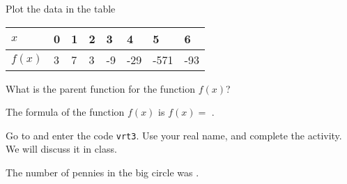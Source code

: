 \documentclass{ximera}
\begin{document}
\begin{question}
Plot the data in the table
\begin{center}
\begin{tabular}{llllllll}
    $x$  & 0 & 1 & 2 & 3  & 4   & 5    & 6   \\ \hline
    $f(x)$ & 3 & 7 & 3 & -9 & -29 & -571 & -93 \\
\end{tabular}
\end{center} 
What is the parent function for the function $f(x)$?
\begin{solution}
\begin{multiple-choice}
\end{multiple-choice}
The formula of the function $f(x)$ is $f(x)=$ .
\end{solution}

\end{question}




\begin{question}
Go to  and enter the code \verb|vrt3|. Use your real name, and complete the activity. We will discuss it in class.
\begin{solution}
The number of pennies in the big circle was .
\end{solution}
\end{question}
\end{document}

